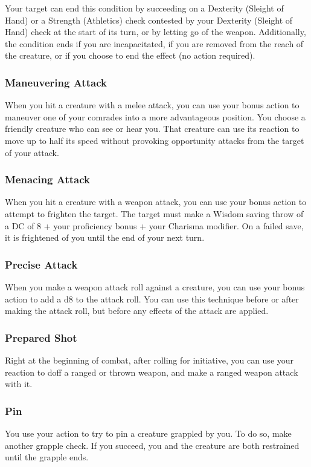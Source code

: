 Your target can end this condition by succeeding on a Dexterity (Sleight of Hand) or a Strength (Athletics) check contested by your Dexterity (Sleight of Hand) check at the start of its turn, or by letting go of the weapon.
Additionally, the condition ends if you are incapacitated, if you are removed from the reach of the creature, or if you choose to end the effect (no action required).

\subsubsection{Maneuvering Attack} \label{tec::maneuveringattack}
When you hit a creature with a melee attack, you can use your bonus action to maneuver one of your comrades into a more advantageous position.
You choose a friendly creature who can see or hear you.
That creature can use its reaction to move up to half its speed without provoking opportunity attacks from the target of your attack.

\subsubsection{Menacing Attack} \label{tec::menacingattack}
When you hit a creature with a weapon attack, you can use your bonus action to attempt to frighten the target.
The target must make a Wisdom saving throw of a DC of 8 + your proficiency bonus + your Charisma modifier.
On a failed save, it is frightened of you until the end of your next turn.

\subsubsection{Precise Attack} \label{tec::preciseattack}
When you make a weapon attack roll against a creature, you can use your bonus action to add a d8 to the attack roll.
You can use this technique before or after making the attack roll, but before any effects of the attack are applied.

\subsubsection{Prepared Shot} \label{tec::preparedshot}
Right at the beginning of combat, after rolling for initiative, you can use your reaction to doff a ranged or thrown weapon, and make a ranged weapon attack with it.

\subsubsection{Pin} \label{tec::pin}
You use your action to try to pin a creature grappled by you.
To do so, make another grapple check.
If you succeed, you and the creature are both restrained until the grapple ends.


